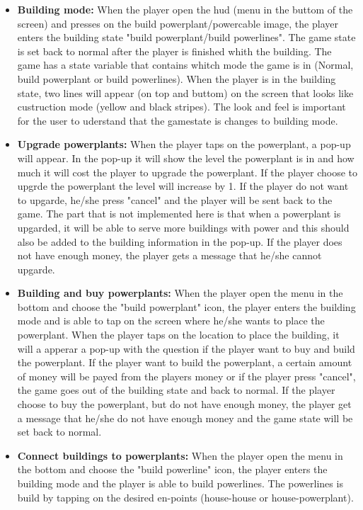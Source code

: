 	\begin{itemize}
		\item {\bf Building mode:} When the player open the hud (menu in the buttom of the screen) and presses
		on the build powerplant/powercable image, the player enters the building state 
		"build powerplant/build powerlines". The game state is set back to normal after the player 
		is finished whith the building. The game has a state variable that contains whitch mode the 
		game is in (Normal, build powerplant or build powerlines). When the player is in the building
		state, two lines will appear (on top and buttom) on the screen that looks like custruction mode
		(yellow and black stripes). The look and feel is important for the user to uderstand that
		the gamestate is changes to building mode. 

		\item {\bf Upgrade powerplants:} When the player taps on the powerplant, a pop-up will appear.
		In the pop-up it will show the level the powerplant is in and how much it will cost the 
		player to upgrade the powerplant. If the player choose to upgrde the powerplant the level will
		increase by 1. If the player do not want to upgarde, he/she press "cancel" and the player will be sent
		back to the game. The part that is not implemented here is that when a powerplant is upgarded, 
		it will be able to serve more buildings with power and this should also be added to the building 
		information in the pop-up. If the player does not have enough money, the player gets a message 
		that he/she cannot upgarde.

		\item {\bf Building and buy powerplants:} When the player open the menu in the bottom and 
		choose the "build powerplant" icon, the player enters the building mode and is able to 
		tap on the screen where he/she wants to place the powerplant. When the player taps on the
		location to place the building, it will a apperar a pop-up with the question if the player 
		want to buy and build the powerplant. If the player want to build the powerplant, a certain
		amount of money will be payed from the players money or if the player press "cancel", the 
		game goes out of the building state and back to normal. If the player choose to buy the 
		powerplant, but do not have enough money, the player get a message that he/she do not have
		enough money and the game state will be set back to normal. 

		\item {\bf Connect buildings to powerplants:} When the player open the menu in the bottom and 
		choose the "build powerline" icon, the player enters the building mode and the player is able
		to build powerlines. The powerlines is build by tapping on the desired en-points (house-house 
		or house-powerplant).


\end{itemize}
